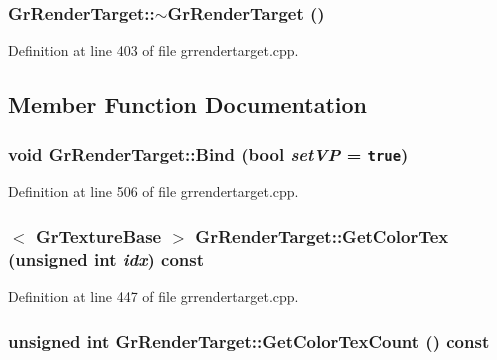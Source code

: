 \begin{CompactItemize}
{\subsubsection[{$\sim$GrRenderTarget}]{\setlength{\rightskip}{0pt plus 5cm}GrRenderTarget::$\sim$GrRenderTarget ()}}
\label{class_gr_render_target_734fdac5e2128109017b6d3d7abac6b5}




Definition at line 403 of file grrendertarget.cpp.

\subsection{Member Function Documentation}
\hypertarget{class_gr_render_target_26ee9e8fef318184bbf038f4b718f746}{
\subsubsection[{Bind}]{\setlength{\rightskip}{0pt plus 5cm}void GrRenderTarget::Bind (bool {\em setVP} = {\tt true})}}
\label{class_gr_render_target_26ee9e8fef318184bbf038f4b718f746}




Definition at line 506 of file grrendertarget.cpp.\hypertarget{class_gr_render_target_880ba8f3d25b4217fcc324a985adc5ce}{
\subsubsection[{GetColorTex}]{$<$ {\bf GrTextureBase} $>$ GrRenderTarget::GetColorTex (unsigned int {\em idx}) const}}
\label{class_gr_render_target_880ba8f3d25b4217fcc324a985adc5ce}




Definition at line 447 of file grrendertarget.cpp.\hypertarget{class_gr_render_target_93fe155f4877c4361c5eb97f54826583}{
\subsubsection[{GetColorTexCount}]{\setlength{\rightskip}{0pt plus 5cm}unsigned int GrRenderTarget::GetColorTexCount () const}}
\label{class_gr_render_target_93fe155f4877c4361c5eb97f54826583}





\end{CompactItemize}
